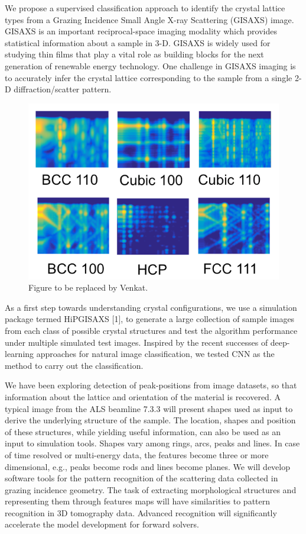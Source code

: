 We propose a supervised classification approach to identify the crystal lattice types from a Grazing Incidence Small Angle X-ray Scattering (GISAXS) image. GISAXS is an important reciprocal-space imaging modality which provides statistical information about a sample in 3-D. GISAXS is widely used for
studying thin films that play a vital role as building blocks for the next generation of renewable energy technology. One challenge in GISAXS imaging is to accurately infer the crystal lattice corresponding to the sample from a single 2-D diffraction/scatter pattern.

\begin{figure}[!t]
\centering
\includegraphics[width=.439\linewidth]{img/gisaxs1.png}
\caption{Figure to be replaced by Venkat.}
\label{fig:gisaxs}
\end{figure}

As a first step towards understanding crystal configurations, we use a simulation package termed HiPGISAXS [1], to generate a large collection of sample images from each class of possible crystal structures and test the algorithm performance under multiple simulated test images. Inspired by the
recent successes of deep-learning approaches for natural image classification, we tested CNN as the method to carry out the classification.

We have been exploring detection of peak-positions from image datasets, so that information about the lattice and orientation of the material is recovered. A typical image from the ALS beamline 7.3.3 will present shapes used as input to derive the underlying structure of the sample. The location, shapes and position of these structures, while yielding useful information, can also be used as an input to simulation tools. Shapes vary among rings, arcs, peaks and lines. In case of time resolved or multi-energy data, the features become three or more dimensional, e.g., peaks become rods and lines become planes. We will develop software tools for the pattern recognition of the scattering data collected in grazing incidence geometry. The task of extracting morphological structures and representing them through features maps will have similarities to pattern recognition in 3D tomography data. Advanced recognition will significantly accelerate the model development for forward solvers.

